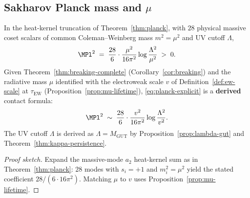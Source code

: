 \subsection{Sakharov Planck mass and $\mu$}
\label{sec:scales:planck}

\begin{proposition}
\label{prop:planck-scale}
In the heat-kernel truncation of Theorem~\ref{thm:planck}, with $28$ physical
massive coset scalars of common Coleman--Weinberg mass $m^2=\mu^2$ and UV
cutoff $\Lambda$,
\begin{equation}\label{eq:planck-explicit}
  \MPl^2
  \;=\;
  \frac{28}{6}\cdot\frac{\mu^2}{16\pi^2}
  \log\frac{\Lambda^2}{\mu^2}
  \;>\;0.
\end{equation}
Given Theorem~\ref{thm:breaking-complete} (Corollary~\ref{cor:breaking}) and
the radiative mass $\mu$ identified with the electroweak scale $v$ of
Definition~\ref{def:ew-scale} at $\tau_{\mathrm{EW}}$
(Proposition~\ref{prop:mu-lifetime}), \eqref{eq:planck-explicit} is a
\textbf{derived} contact formula:
\begin{equation}\label{eq:planck-v}
  \MPl^2
  \;\sim\;
  \frac{28}{6}\cdot\frac{v^2}{16\pi^2}
  \log\frac{\Lambda^2}{v^2}.
\end{equation}
The UV cutoff $\Lambda$ is derived as $\Lambda=M_{\mathrm{GUT}}$ by
Proposition~\ref{prop:lambda-gut} and Theorem~\ref{thm:kappa-persistence}.
\end{proposition}

\begin{proof}[Proof sketch]
Expand the massive-mode $a_2$ heat-kernel sum as in
Theorem~\ref{thm:planck}: $28$ modes with $s_i=+1$ and $m_i^2=\mu^2$ yield
the stated coefficient $28/(6\cdot16\pi^2)$. Matching $\mu$ to $v$ uses
Proposition~\ref{prop:mu-lifetime}.
\end{proof}

